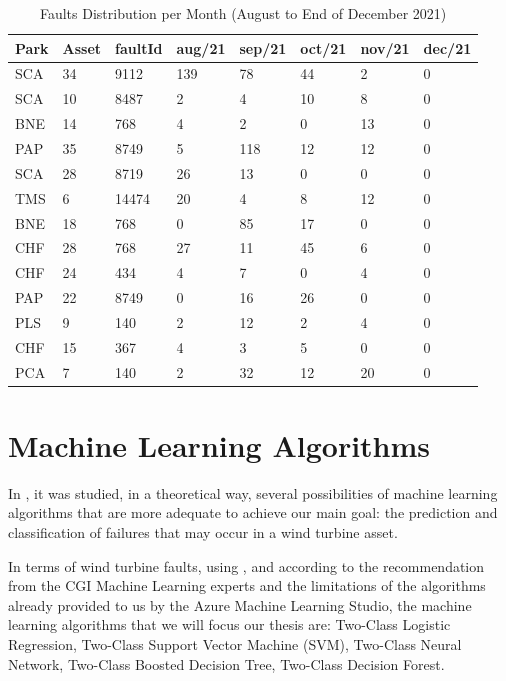 \begin{table}[!ht]
    \centering
    \begin{tabular}{|l|l|l|l|l|l|l|l|}
    \hline
        Park & Asset & faultId & aug/21 & sep/21 & oct/21 & nov/21 & dec/21 \\ \hline
        SCA & 34 & 9112 & 139 & 78 & 44 & 2 & 0 \\ \hline
        SCA & 10 & 8487 & 2 & 4 & 10 & 8 & 0 \\ \hline
        BNE & 14 & 768 & 4 & 2 & 0 & 13 & 0 \\ \hline
        PAP & 35 & 8749 & 5 & 118 & 12 & 12 & 0 \\ \hline
        SCA & 28 & 8719 & 26 & 13 & 0 & 0 & 0 \\ \hline
        TMS & 6 & 14474 & 20 & 4 & 8 & 12 & 0 \\ \hline
        BNE & 18 & 768 & 0 & 85 & 17 & 0 & 0 \\ \hline
        CHF & 28 & 768 & 27 & 11 & 45 & 6 & 0 \\ \hline
        CHF & 24 & 434 & 4 & 7 & 0 & 4 & 0 \\ \hline
        PAP & 22 & 8749 & 0 & 16 & 26 & 0 & 0 \\ \hline
        PLS & 9 & 140 & 2 & 12 & 2 & 4 & 0 \\ \hline
        CHF & 15 & 367 & 4 & 3 & 5 & 0 & 0 \\ \hline
        PCA & 7 & 140 & 2 & 32 & 12 & 20 & 0 \\ \hline
    \end{tabular}
    \caption{Faults Distribution per Month (August to End of December 2021)}
    \label{FaultsDistribitutionAugDec21}
\end{table}


\section{Machine Learning Algorithms} 
\label{sub:if_you_use_this_template} 

In \cite{OLD_15_WIND} \cite{40_WIND} \cite{OLD_36_SOLAR}, it was studied, in a theoretical way, several possibilities of machine learning algorithms that are more adequate to achieve our main goal: the prediction and classification of failures that may occur in a wind turbine asset.

In terms of wind turbine faults, using \cite{OLD_15_WIND} \cite{OLD_53_WIND} \cite{40_WIND} \cite{ML_Alg_Analysis}, \cite{ML_Data_processing} and according to the recommendation from the CGI Machine Learning experts and the limitations of the algorithms already provided to us by the Azure Machine Learning Studio, the machine learning algorithms that we will focus our thesis are: Two-Class Logistic Regression, Two-Class Support Vector Machine (SVM), Two-Class Neural Network, Two-Class Boosted Decision Tree, Two-Class Decision Forest.


